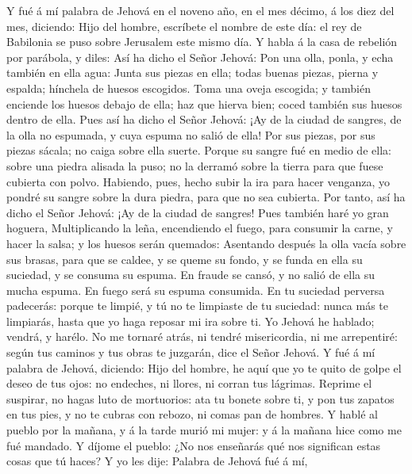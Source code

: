  Y fué á mí palabra de Jehová en el noveno año, en el mes
décimo, á los diez del mes, diciendo:  Hijo del hombre,
escríbete el nombre de este día: el rey de Babilonia se puso sobre
Jerusalem este mismo día.  Y habla á la casa de rebelión
por parábola, y diles: Así ha dicho el Señor Jehová: Pon una olla,
ponla, y echa también en ella agua:  Junta sus piezas en
ella; todas buenas piezas, pierna y espalda; hínchela de huesos
escogidos.  Toma una oveja escogida; y también enciende
los huesos debajo de ella; haz que hierva bien; coced también sus huesos
dentro de ella.  Pues así ha dicho el Señor Jehová: ¡Ay de
la ciudad de sangres, de la olla no espumada, y cuya espuma no salió de
ella! Por sus piezas, por sus piezas sácala; no caiga sobre ella suerte.
 Porque su sangre fué en medio de ella: sobre una piedra
alisada la puso; no la derramó sobre la tierra para que fuese cubierta
con polvo.  Habiendo, pues, hecho subir la ira para hacer
venganza, yo pondré su sangre sobre la dura piedra, para que no sea
cubierta.  Por tanto, así ha dicho el Señor Jehová: ¡Ay de
la ciudad de sangres! Pues también haré yo gran hoguera, 
Multiplicando la leña, encendiendo el fuego, para consumir la carne, y
hacer la salsa; y los huesos serán quemados:  Asentando
después la olla vacía sobre sus brasas, para que se caldee, y se queme
su fondo, y se funda en ella su suciedad, y se consuma su espuma.
 En fraude se cansó, y no salió de ella su mucha espuma.
En fuego será su espuma consumida.  En tu suciedad
perversa padecerás: porque te limpié, y tú no te limpiaste de tu
suciedad: nunca más te limpiarás, hasta que yo haga reposar mi ira sobre
ti.  Yo Jehová he hablado; vendrá, y harélo. No me
tornaré atrás, ni tendré misericordia, ni me arrepentiré: según tus
caminos y tus obras te juzgarán, dice el Señor Jehová.  Y
fué á mí palabra de Jehová, diciendo:  Hijo del hombre,
he aquí que yo te quito de golpe el deseo de tus ojos: no endeches, ni
llores, ni corran tus lágrimas.  Reprime el suspirar, no
hagas luto de mortuorios: ata tu bonete sobre ti, y pon tus zapatos en
tus pies, y no te cubras con rebozo, ni comas pan de hombres.
 Y hablé al pueblo por la mañana, y á la tarde murió mi
mujer: y á la mañana hice como me fué mandado.  Y díjome
el pueblo: ¿No nos enseñarás qué nos significan estas cosas que tú
haces?  Y yo les dije: Palabra de Jehová fué á mí,
